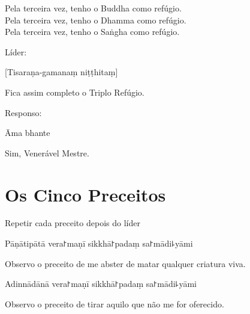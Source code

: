 \documentclass[
  babelLanguage=portuguese,
  final,
  showtrims,
]{chantingbook}
\begin{document}
\begin{english}
  Pela terceira vez, tenho o Buddha como refúgio.\\
  Pela terceira vez, tenho o Dhamma como refúgio.\\
  Pela terceira vez, tenho o Saṅgha como refúgio.
\end{english}

\begin{instruction}
  Líder:
\end{instruction}

[Tisaraṇa-gamanaṃ niṭṭhitaṃ]

\begin{english}
  Fica assim completo o Triplo Refúgio.
\end{english}

\begin{instruction}
  Responso:
\end{instruction}

Āma bhante

\begin{english}
  Sim, Venerável Mestre.
\end{english}

\chapter{Os Cinco Preceitos}

\begin{instruction}
  Repetir cada preceito depois do líder
\end{instruction}

\begin{precept}
  \setcounter{enumi}{0}
  \item Pāṇātipātā vera꜓maṇī sikkhā꜓padaṃ sa꜓mādi꜕yāmi
\end{precept}

\begin{english}
  Observo o preceito de me abster de matar qualquer criatura viva.
\end{english}

\begin{precept}
  \setcounter{enumi}{1}
  \item Adinnādānā vera꜓maṇī sikkhā꜓padaṃ sa꜓mādi꜕yāmi
\end{precept}

\begin{english}
  Observo o preceito de tirar aquilo que não me for oferecido.
\end{english}
\end{document}
